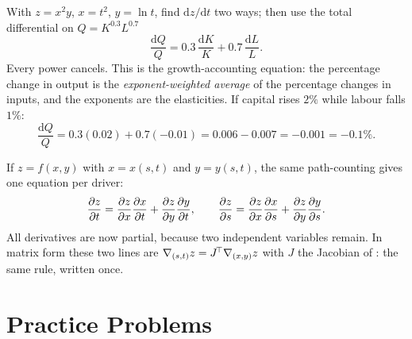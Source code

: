 \begin{worked}{With $z=x^{2}y$, $x=t^{2}$, $y=\ln t$, find $\mathrm{d}z/\mathrm{d}t$ two ways; then use the total differential on $Q=K^{0.3}L^{0.7}$}
\[
  \frac{\mathrm{d}Q}{Q}
  =0.3\,\frac{\mathrm{d}K}{K}+0.7\,\frac{\mathrm{d}L}{L} .
\]
Every power cancels. This is the growth-accounting equation: the percentage
change in output is the \emph{exponent-weighted average} of the percentage
changes in inputs, and the exponents are the elasticities. If capital rises
$2\%$ while labour falls $1\%$:
\[
  \frac{\mathrm{d}Q}{Q}=0.3(0.02)+0.7(-0.01)=0.006-0.007=-0.001=-0.1\% .
\]

If $z=f(x,y)$ with $x=x(s,t)$ and $y=y(s,t)$, the same path-counting gives
one equation per driver:
\[
  \frac{\partial z}{\partial t}=\frac{\partial z}{\partial x}\frac{\partial x}{\partial t}+\frac{\partial z}{\partial y}\frac{\partial y}{\partial t},
  \qquad
  \frac{\partial z}{\partial s}=\frac{\partial z}{\partial x}\frac{\partial x}{\partial s}+\frac{\partial z}{\partial y}\frac{\partial y}{\partial s} .
\]
All derivatives are now partial, because two independent variables remain.
In matrix form these two lines are $\nabla_{(s,t)}z=J^{\!\top}\nabla_{(x,y)}z$
with $J$ the Jacobian of : the same rule, written once.
\end{worked}

\section{Practice Problems}

